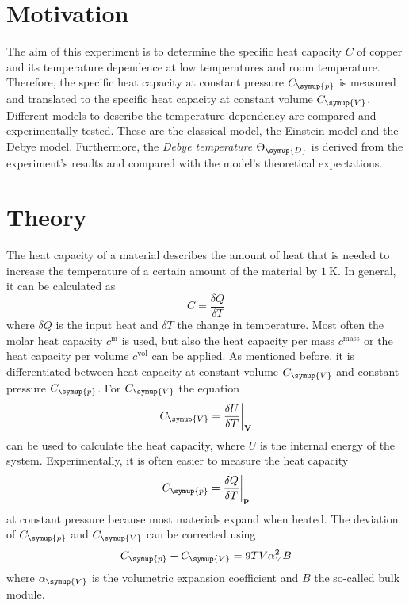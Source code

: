 \section{Motivation}
\label{sec:Motivation}
The aim of this experiment is to determine the specific heat capacity $C$ of copper and its temperature dependence at low temperatures and room temperature.
Therefore, the specific heat capacity at constant pressure $C_{\symup{p}}$ is measured and translated to the specific heat capacity at constant volume $C_{\symup{V}}$.
Different models to describe the temperature dependency are compared and experimentally tested. These are the classical model, the Einstein model and the Debye model.
Furthermore, the \textit{Debye temperature} $\Theta_{\symup{D}}$ is
derived from the experiment's results and compared with the model's theoretical expectations.

\section{Theory}
\label{sec:Theory}
The heat capacity of a material describes the amount of heat that is needed to increase the temperature of a certain amount of the material by $\qty{1}{\kelvin}$.
In general, it can be calculated as
\begin{equation*}
    C = \frac{\delta Q}{\delta T}
\end{equation*}
where $\delta Q$ is the input heat and $\delta T$ the change in temperature.
Most often the molar heat capacity $c^\text{m}$ is used, but also the heat capacity per mass $c^\text{mass}$ or the heat capacity per volume $c^\text{vol}$ can be applied.
As mentioned before, it is differentiated between heat capacity at constant volume $C_{\symup{V}}$ and constant pressure $C_{\symup{p}}$.
For $C_{\symup{V}}$ the equation
\begin{equation}
    \label{eqn:CV}
    C_{\symup{V}} = \frac{\delta U}{\delta T} \biggr\rvert_{\mathbf{V}}
\end{equation}
can be used to calculate the heat capacity, where $U$ is the internal energy of the system. Experimentally, it is often easier to measure the heat capacity
\begin{equation}
    C_{\symup{p}} = \frac{\delta Q}{\delta T} \biggr\rvert_{\mathbf{p}}
    \label{eq:Cp}
\end{equation}
at constant pressure because most materials expand when heated.
The deviation of $C_{\symup{p}}$ and $C_{\symup{V}}$ can be corrected using
\begin{equation}
    \label{eqn:Cp_CV}
    C_{\symup{p}} - C_{\symup{V}} = 9 T V \alpha^2_V B
\end{equation}
where $\alpha_{\symup{V}}$ is the volumetric expansion coefficient and $B$ the so-called bulk module.

